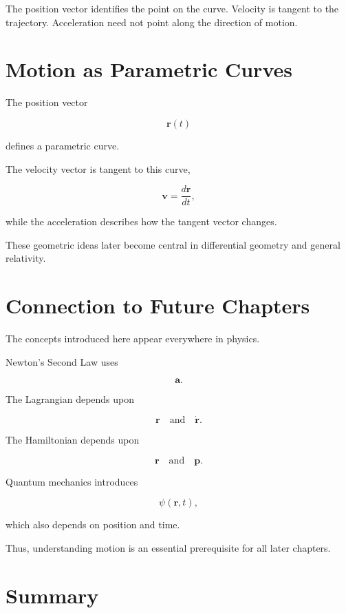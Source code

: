 \documentclass[11pt,a4paper,openany]{book}
\begin{document}
\begin{visualguidebox}
The position vector identifies the point on the curve. Velocity is tangent to
the trajectory. Acceleration need not point along the direction of motion.
\end{visualguidebox}


\section{Motion as Parametric Curves}

The position vector

\[
\mathbf r(t)
\]

defines a parametric curve.

The velocity vector is tangent to this curve,

\[
\mathbf v
=
\frac{d\mathbf r}{dt},
\]

while the acceleration describes how the tangent vector changes.

These geometric ideas later become central in differential geometry and
general relativity.


\section{Connection to Future Chapters}

The concepts introduced here appear everywhere in physics.

Newton's Second Law uses

\[
\mathbf a.
\]

The Lagrangian depends upon

\[
\mathbf r
\quad\text{and}\quad
\dot{\mathbf r}.
\]

The Hamiltonian depends upon

\[
\mathbf r
\quad\text{and}\quad
\mathbf p.
\]

Quantum mechanics introduces

\[
\psi(\mathbf r,t),
\]

which also depends on position and time.

Thus, understanding motion is an essential prerequisite for all later chapters.


\section{Summary}
\end{document}
